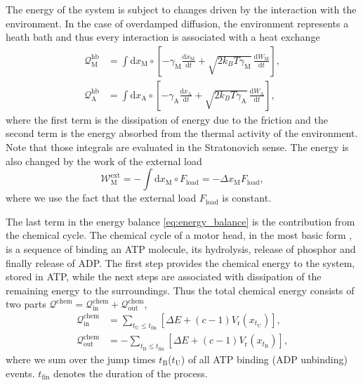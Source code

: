 \documentclass[aps,pre,twocolumn,showpacs,showkeys,superscriptaddress,floatfix]{revtex4-1}
\newcommand{\rmd}{{\mathrm d}}
\begin{document}
The energy of the system is subject to changes driven by the interaction with the environment.
In the case of overdamped diffusion, the environment represents a heath bath
and thus every interaction is associated with a heat exchange \cite{Pesek2013}
\begin{align}
{\mathcal Q}_\text{M}^\text{hb} 
&= \int \rmd x_\text{M} \circ \left[ - \gamma_\text{M} \frac{\rmd x_\text{M} }{\rmd t} + \sqrt{ 2 k_B T \gamma_\text{M} } \, \frac{ \rmd W_\text{M} }{ \rmd t } \right] , 
\label{eq:heat_hb_M} \\
{\mathcal Q}_\text{A}^\text{hb} 
&= \int \rmd x_\text{A} \circ \left[ - \gamma_\text{A} \frac{\rmd x_\text{A} }{\rmd t} + \sqrt{ 2 k_B T \gamma_\text{A} } \, \frac{ \rmd W_\text{A} }{ \rmd t } \right] ,
\label{eq:heat_hb_A}
\end{align} 
where the first term is the dissipation of energy due to the friction and the second term is the energy absorbed from the thermal activity of the environment.
Note that those integrals are evaluated in the Stratonovich sense.
The energy is also changed by the work of the external load 
\begin{equation}
{\mathcal W}^\text{ext}_\text{M} = - \int \rmd x_\text{M} \circ F_\text{load} = - \Delta x_\text{M} F_\text{load}, 
\label{eq:work_load}
\end{equation}
where we use the fact that the external load $F_\text{load}$ is constant. 

The last term in the energy balance \eqref{eq:energy_balance} is the contribution from the chemical cycle. 
The chemical cycle of a motor head, in the most basic form \cite{astumian1996mechanochemical,Bierbaum2011,Bierbaum2013,Albert2014}, is a sequence of binding an ATP molecule, its hydrolysis, release of phosphor and finally release of ADP.
The first step provides the chemical energy to the system, stored in ATP, while the next steps are associated with dissipation of the remaining energy to the surroundings.
Thus the total chemical energy consists of two parts ${\mathcal Q}^\text{chem} = {\mathcal Q}^\text{chem}_\text{in} + {\mathcal Q}^\text{chem}_\text{out}$,
\begin{align}
{\mathcal Q}_\text{in}^\text{chem} 
&= \sum_{t_\text{U} \leq t_\text{fin} } \left[ \Delta E + (c-1) V_\text{r}(x_{t_\text{U}}) \right] , 
\label{eq:q_in} \\
{\mathcal Q}_\text{out}^\text{chem} 
&= -\sum_{t_\text{B} \leq t_\text{fin} } \left[ \Delta E + (c-1) V_\text{r}(x_{t_\text{B}}) \right] ,
\label{eq:q_out}
\end{align}
where we sum over the jump times $t_\text{B}$($t_\text{U}$) of all ATP binding (ADP unbinding) events.
$t_\text{fin}$ denotes the duration of the process. 
\end{document}
